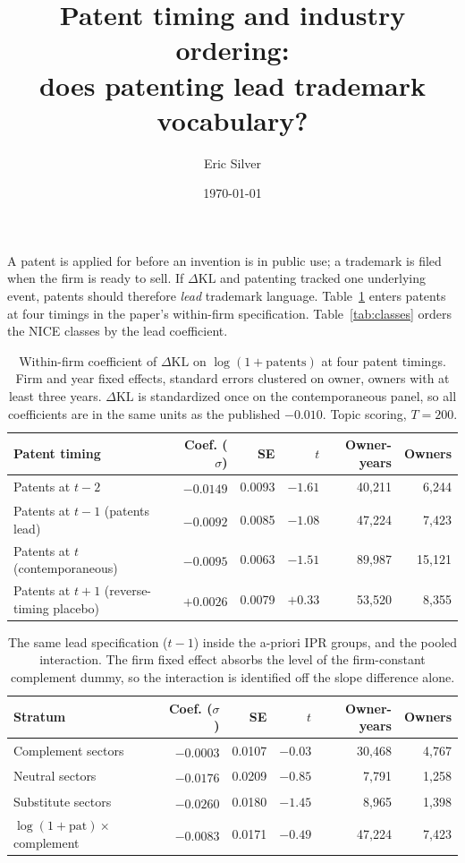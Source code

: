 \documentclass[11pt]{article}
\title{\vspace{-2.5em}\bfseries Patent timing and industry ordering:\\ does patenting lead trademark vocabulary?}
\author{Eric Silver}\date{\today}
\newcommand{\dkl}{\Delta\mathrm{KL}}
\begin{document}
\maketitle\vspace{-1.5em}
\noindent A patent is applied for before an invention is in public use; a trademark is filed when the firm is ready to sell. If $\dkl$ and patenting tracked one underlying event, patents should therefore \emph{lead} trademark language. Table~\ref{tab:timing} enters patents at four timings in the paper's within-firm specification. Table~\ref{tab:classes} orders the NICE classes by the lead coefficient.
\begin{table}[h]\centering\small
\caption{Within-firm coefficient of $\dkl$ on $\log(1+\text{patents})$ at four patent timings. Firm and year fixed effects, standard errors clustered on owner, owners with at least three years. $\dkl$ is standardized once on the contemporaneous panel, so all coefficients are in the same units as the published $-0.010$. Topic scoring, $T=200$.}
\label{tab:timing}
\begin{tabular}{lrrrrr}\toprule
Patent timing & Coef. ($\sigma$) & SE & $t$ & Owner-years & Owners \\\midrule
Patents at $t-2$ & $-0.0149$\textsuperscript{} & 0.0093 & $-1.61$ & 40,211 & 6,244 \\
Patents at $t-1$ (patents lead) & $-0.0092$\textsuperscript{} & 0.0085 & $-1.08$ & 47,224 & 7,423 \\
Patents at $t$ (contemporaneous) & $-0.0095$\textsuperscript{} & 0.0063 & $-1.51$ & 89,987 & 15,121 \\
Patents at $t+1$ (reverse-timing placebo) & $+0.0026$\textsuperscript{} & 0.0079 & $+0.33$ & 53,520 & 8,355 \\
\bottomrule\end{tabular}\end{table}
\vspace{-0.8em}
\begin{table}[h]\centering\small
\caption{The same lead specification ($t-1$) inside the a-priori IPR groups, and the pooled interaction. The firm fixed effect absorbs the level of the firm-constant complement dummy, so the interaction is identified off the slope difference alone.}
\label{tab:groups}
\begin{tabular}{lrrrrr}\toprule
Stratum & Coef. ($\sigma$) & SE & $t$ & Owner-years & Owners \\\midrule
Complement sectors & $-0.0003$\textsuperscript{} & 0.0107 & $-0.03$ & 30,468 & 4,767 \\
Neutral sectors & $-0.0176$\textsuperscript{} & 0.0209 & $-0.85$ & 7,791 & 1,258 \\
Substitute sectors & $-0.0260$\textsuperscript{} & 0.0180 & $-1.45$ & 8,965 & 1,398 \\
\midrule
$\log(1+\text{pat})\times$complement & $-0.0083$\textsuperscript{} & 0.0171 & $-0.49$ & 47,224 & 7,423 \\
\bottomrule\end{tabular}\end{table}
\end{document}
